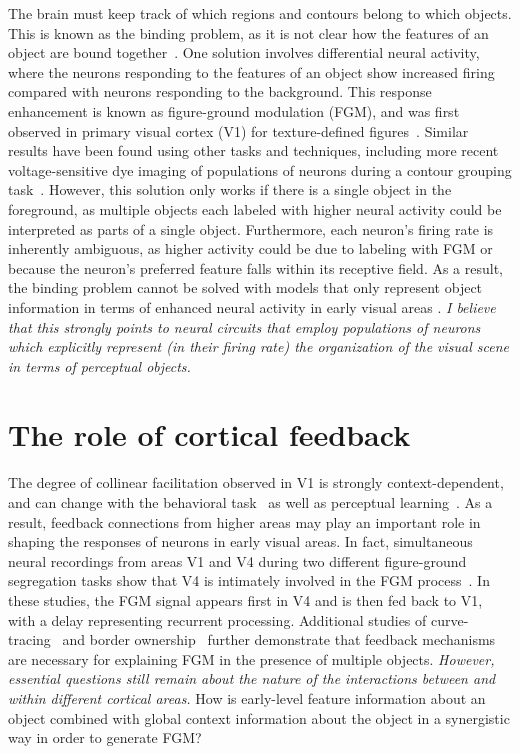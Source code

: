 The brain must keep track of which regions and contours belong to which objects. This is known as the binding problem, as it is not clear how the features of an object are bound together~\citep{Treisman96b}. One solution involves differential neural activity, where the neurons responding to the features of an
object show increased firing compared with neurons responding to the
background. This response enhancement is known as figure-ground modulation (FGM), and was first observed in primary visual cortex (V1) for texture-defined figures~\citep{Lamme95}. Similar results have been found using other tasks and techniques, including more recent voltage-sensitive dye imaging of populations of neurons during a contour grouping task~\citep{Gilad_etal13}. However, this solution only works if there is a single object in the foreground, as multiple objects each labeled with higher neural activity could be interpreted as parts of a single object. Furthermore, each neuron's firing rate is inherently ambiguous, as higher activity could be due to labeling with FGM or because the neuron's preferred feature falls within its receptive field. As a result, the binding problem cannot be solved 
with models that only represent object information in terms of enhanced neural activity in early visual areas \citep{Niebur00a}. {\em I believe that this strongly points to neural circuits that employ populations of neurons which explicitly represent (\ie in their firing rate) the organization of the visual scene in terms of perceptual objects.}

\section{The role of cortical feedback}
The degree of collinear facilitation observed in V1 is strongly context-dependent, and can change with the behavioral task~\citep{Li_etal04, Li_etal06} as well as perceptual learning~\citep{Li_Gilbert_etal08, Yan_etal14}. As a result, feedback connections from higher areas may play an important role in shaping the responses of neurons in early visual areas. In fact, simultaneous neural recordings from areas V1 and V4 during two different figure-ground segregation tasks show that V4 is intimately involved in the FGM process~\citep{Poort_etal12, Chen_etal14}. In these studies, the FGM signal appears first in V4 and is then fed back to V1, with a delay representing recurrent processing. Additional studies of curve-tracing~\citep{Roelfsema_etal98} and border ownership~\citep{Zhou_etal00, Qiu_etal07, Zhang_vonderHeydt10} further
demonstrate that feedback mechanisms are necessary for explaining FGM
in the presence of multiple objects. \textit{However, essential  questions still remain about the nature of the interactions between  and within different cortical areas.} How is early-level feature information about an object combined with global context information about the object in a synergistic way in order to generate FGM?

